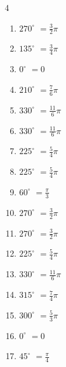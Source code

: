 \begin{multicols}{4}
\begin{enumerate}
  \item $\displaystyle 270^{\circ}$
        $\displaystyle =\frac{3}{2}\pi$

  \item $\displaystyle 135^{\circ}$
        $\displaystyle =\frac{3}{4}\pi$

  \item $\displaystyle 0^{\circ}$
        $\displaystyle =0$

  \item $\displaystyle 210^{\circ}$
        $\displaystyle =\frac{7}{6}\pi$

  \item $\displaystyle 330^{\circ}$
        $\displaystyle =\frac{11}{6}\pi$

  \item $\displaystyle 330^{\circ}$
        $\displaystyle =\frac{11}{6}\pi$

  \item $\displaystyle 225^{\circ}$
        $\displaystyle =\frac{5}{4}\pi$

  \item $\displaystyle 225^{\circ}$
        $\displaystyle =\frac{5}{4}\pi$

  \item $\displaystyle 60^{\circ}$
        $\displaystyle =\frac{\pi}{3}$

  \item $\displaystyle 270^{\circ}$
        $\displaystyle =\frac{3}{2}\pi$

  \item $\displaystyle 270^{\circ}$
        $\displaystyle =\frac{3}{2}\pi$

  \item $\displaystyle 225^{\circ}$
        $\displaystyle =\frac{5}{4}\pi$

  \item $\displaystyle 330^{\circ}$
        $\displaystyle =\frac{11}{6}\pi$

  \item $\displaystyle 315^{\circ}$
        $\displaystyle =\frac{7}{4}\pi$

  \item $\displaystyle 300^{\circ}$
        $\displaystyle =\frac{5}{3}\pi$

  \item $\displaystyle 0^{\circ}$
        $\displaystyle =0$

  \item $\displaystyle 45^{\circ}$
        $\displaystyle =\frac{\pi}{4}$


\end{enumerate}
\end{multicols}
